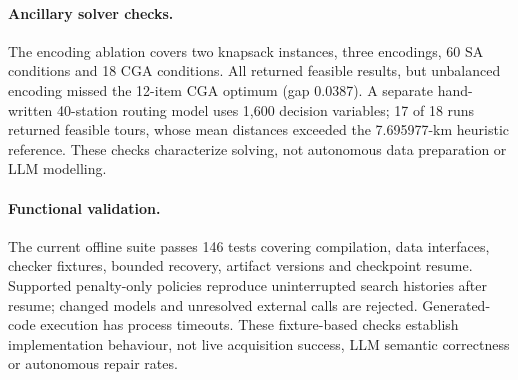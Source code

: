 \paragraph{Ancillary solver checks.}
The encoding ablation covers two knapsack instances, three encodings, 60 SA conditions and 18 CGA conditions.
All returned feasible results, but unbalanced encoding missed the 12-item CGA optimum (gap 0.0387).
A separate hand-written 40-station routing model uses 1,600 decision variables; 17 of 18 runs returned feasible
tours, whose mean distances exceeded the 7.695977-km heuristic reference. These checks characterize solving,
not autonomous data preparation or LLM modelling.

\paragraph{Functional validation.}
\label{sec:integrationchecks}
The current offline suite passes 146 tests covering compilation, data interfaces, checker fixtures, bounded
recovery, artifact versions and checkpoint resume. Supported penalty-only policies reproduce uninterrupted
search histories after resume; changed models and unresolved external calls are rejected. Generated-code
execution has process timeouts. These fixture-based checks establish implementation behaviour, not live
acquisition success, LLM semantic correctness or autonomous repair rates.
